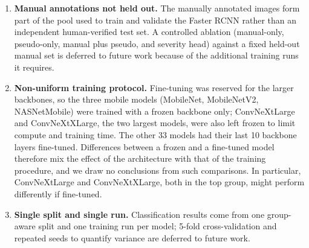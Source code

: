 \begin{enumerate}[noitemsep]
    Detection mAP@0.5:0.95 is 0.104 for small objects versus 0.388 for
    large regions, and Grounding DINO frequently returns a single box
    per image regardless of the true lesion count
    (Section~\ref{sec:detection}), limiting recall and dynamic
    severity accuracy for multi-lesion classes.
  \item \textbf{Manual annotations not held out.} The manually
    annotated images form part of the pool used to train and validate
    the Faster RCNN rather than an independent human-verified test set.
    A controlled ablation (manual-only, pseudo-only, manual plus
    pseudo, and severity head) against a fixed held-out manual set is
    deferred to future work because of the additional training runs it
    requires.
  \item \textbf{Non-uniform training protocol.} Fine-tuning was reserved 
  for the larger backbones, so the three mobile models 
  (MobileNet, MobileNetV2, NASNetMobile) were trained with a frozen 
  backbone only; ConvNeXtLarge and ConvNeXtXLarge, the two largest 
  models, were also left frozen to limit compute and training time. 
  The other 33 models had their last 10 backbone layers fine-tuned.
  Differences between a frozen and a fine-tuned model therefore mix 
  the effect of the architecture with that of the training procedure, 
  and we draw no conclusions from such comparisons. In particular, 
  ConvNeXtLarge and ConvNeXtXLarge, both in the top group, might 
  perform differently if fine-tuned.
  \item \textbf{Single split and single run.} Classification results
    come from one group-aware split and one training run per model;
    5-fold cross-validation and repeated seeds to quantify variance
    are deferred to future work.
\end{enumerate}

